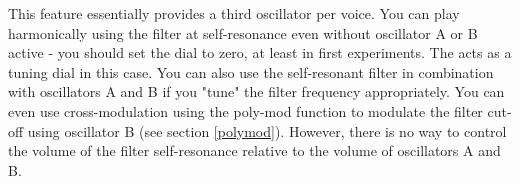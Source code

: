 This feature essentially provides a third oscillator per voice. You can play harmonically using the filter at self-resonance even without oscillator A or B active - you should set the \filterenv dial to zero, at least in first experiments. The \filtercutoff acts as a tuning dial in this case. You can also use the self-resonant filter in combination with oscillators A and B if you "tune" the filter frequency appropriately. You can even use cross-modulation using the poly-mod function to modulate the filter cut-off using oscillator B (see section \ref{polymod}). However, there is no way to control the volume of the filter self-resonance relative to the volume of oscillators A and B.   

